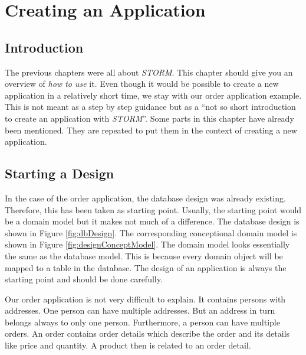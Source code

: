 \chapter{Creating an Application}
\label{cha:createApplication}

	\section{Introduction}
		The previous chapters were all about \textit{STORM}. This chapter should give
		you an overview of \emph{how to use} it. Even though it would be possible
		to create a new application in a relatively short time, we stay with our 
		order application example. This is not meant as a step by step guidance but
		as a ``not so short introduction to create an application with \textit{STORM}''.
		Some parts in this chapter have already been mentioned. They
		are repeated to put them in the context of creating a new application.
	
	\section{Starting a Design}
		In the case of the order application, the database design was already existing.
		Therefore, this has been taken as starting point. Usually, the starting
		point would be a domain model but it makes not much of a difference. The
		database design is shown in Figure \ref{fig:dbDesign}. The corresponding
		conceptional domain model is shown in Figure \ref{fig:designConceptModel}.
		The domain model looks essentially the same as the database model.
		This is because every domain object will be mapped to a table in
		the database. The design of an application is always the starting point
		and should be done carefully.
		
		Our order application is not very difficult to explain. It contains
		persons with addresses. One person can have multiple addresses. But an
		address in turn belongs always to only one person. Furthermore, a person
		can have multiple orders. An order contains order details which describe
		the order and its details like price and quantity. A product then
		is related to an order detail.
			
